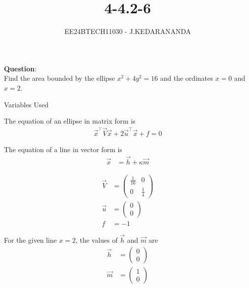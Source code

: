 \documentclass[journal]{IEEEtran}
\numberwithin{equation}{enumi}
\numberwithin{figure}{enumi}
\begin{document}

\title{4-4.2-6}
\author{EE24BTECH11030 - J.KEDARANANDA}
{\let\newpage\relax\maketitle}

\textbf{Question}:\\
Find the area bounded by the ellipse \(x^2 + 4y^2 = 16\) and the ordinates \(x = 0\) and \(x = 2\).

\solution

\begin{table}[h!]    
  \centering
  
  \caption{Variables Used}
  \label{tab1-1.9-6}
\end{table}

The equation of an ellipse in matrix form is
\begin{align}
\vec{x}^\top \vec{V} \vec{x} + 2 \vec{u}^\top \vec{x} + f = 0
\end{align}

The equation of a line in vector form is
\begin{align}
\vec{x} &= \vec{h} + \kappa \vec{m}
\end{align}

\begin{align}
\vec{V} &= \begin{pmatrix} \frac{1}{16} & 0 \\ 0 & \frac{1}{4} \end{pmatrix} \\
\vec{u} &= \begin{pmatrix} 0 \\ 0 \end{pmatrix} \\
f &= -1
\end{align}

For the given line \(x = 2\), the values of \(\vec{h}\) and \(\vec{m}\) are
\begin{align}
\vec{h} &= \begin{pmatrix} 0 \\ 0 \end{pmatrix} \\
\vec{m} &= \begin{pmatrix} 1 \\ 0 \end{pmatrix}
\end{align}
\end{document}
